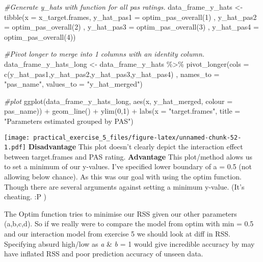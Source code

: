 \documentclass[
]{article}
\newenvironment{Shaded}{\begin{snugshade}}{\end{snugshade}}
\newcommand{\AttributeTok}[1]{\textcolor[rgb]{0.77,0.63,0.00}{#1}}
\newcommand{\CommentTok}[1]{\textcolor[rgb]{0.56,0.35,0.01}{\textit{#1}}}
\newcommand{\DecValTok}[1]{\textcolor[rgb]{0.00,0.00,0.81}{#1}}
\newcommand{\FunctionTok}[1]{\textcolor[rgb]{0.00,0.00,0.00}{#1}}
\newcommand{\NormalTok}[1]{#1}
\newcommand{\OtherTok}[1]{\textcolor[rgb]{0.56,0.35,0.01}{#1}}
\newcommand{\SpecialCharTok}[1]{\textcolor[rgb]{0.00,0.00,0.00}{#1}}
\newcommand{\StringTok}[1]{\textcolor[rgb]{0.31,0.60,0.02}{#1}}
\begin{document}
\begin{Shaded}
\begin{Highlighting}[]
\CommentTok{\#Generate y\_hats with function for all pas ratings. }
\NormalTok{data\_frame\_y\_hats }\OtherTok{\textless{}{-}} \FunctionTok{tibble}\NormalTok{(}\AttributeTok{x =}\NormalTok{ x\_target.frames, }\AttributeTok{y\_hat\_pas1 =} \FunctionTok{optim\_pas\_overall}\NormalTok{(}\DecValTok{1}\NormalTok{)}
\NormalTok{                            , }\AttributeTok{y\_hat\_pas2 =} \FunctionTok{optim\_pas\_overall}\NormalTok{(}\DecValTok{2}\NormalTok{)}
\NormalTok{                            , }\AttributeTok{y\_hat\_pas3 =} \FunctionTok{optim\_pas\_overall}\NormalTok{(}\DecValTok{3}\NormalTok{)}
\NormalTok{                            , }\AttributeTok{y\_hat\_pas4 =} \FunctionTok{optim\_pas\_overall}\NormalTok{(}\DecValTok{4}\NormalTok{))}
\end{Highlighting}
\end{Shaded}

\begin{Shaded}
\begin{Highlighting}[]
\CommentTok{\#Pivot longer to merge into 1 columns with an identity column.}
\NormalTok{data\_frame\_y\_hats\_long }\OtherTok{\textless{}{-}}\NormalTok{ data\_frame\_y\_hats }\SpecialCharTok{\%\textgreater{}\%} 
  \FunctionTok{pivot\_longer}\NormalTok{(}\AttributeTok{cols =} \FunctionTok{c}\NormalTok{(y\_hat\_pas1,y\_hat\_pas2,y\_hat\_pas3,y\_hat\_pas4) , }\AttributeTok{names\_to =} \StringTok{"pas\_name"}\NormalTok{, }\AttributeTok{values\_to =} \StringTok{"y\_hat\_merged"}\NormalTok{)}

\CommentTok{\#plot}
\FunctionTok{ggplot}\NormalTok{(data\_frame\_y\_hats\_long, }\FunctionTok{aes}\NormalTok{(x, y\_hat\_merged, }\AttributeTok{colour =}\NormalTok{ pas\_name)) }\SpecialCharTok{+}
  \FunctionTok{geom\_line}\NormalTok{() }\SpecialCharTok{+} \FunctionTok{ylim}\NormalTok{(}\DecValTok{0}\NormalTok{,}\DecValTok{1}\NormalTok{) }\SpecialCharTok{+} \FunctionTok{labs}\NormalTok{(}\AttributeTok{x =} \StringTok{"target.frames"}\NormalTok{, }\AttributeTok{title =} \StringTok{"Parameters estimated grouped by PAS"}\NormalTok{)}
\end{Highlighting}
\end{Shaded}

\texttt{[image: practical\_exercise\_5\_files/figure-latex/unnamed-chunk-52-1.pdf]}
\textbf{Disadvantage} This plot doesn't clearly depict the interaction
effect between target.frames and PAS rating. \textbf{Advantage} This
plot/method alows us to set a minimum of our y-values. I've specified
lower boundary of a = 0.5 (not allowing below chance). As this was our
goal with using the optim function. Though there are several arguments
against setting a minimum y-value. (It's cheating. :P )

The Optim function tries to minimise our RSS given our other parameters
(a,b,c,d). So if we really were to compare the model from optim with min
= 0.5 and our interaction model from exercise 5 we should look at diff
in RSS. Specifying absurd high/low as \emph{a} \& \emph{b} = 1 would
give incredible accuracy by may have inflated RSS and poor prediction
accuracy of unseen data.
\end{document}
